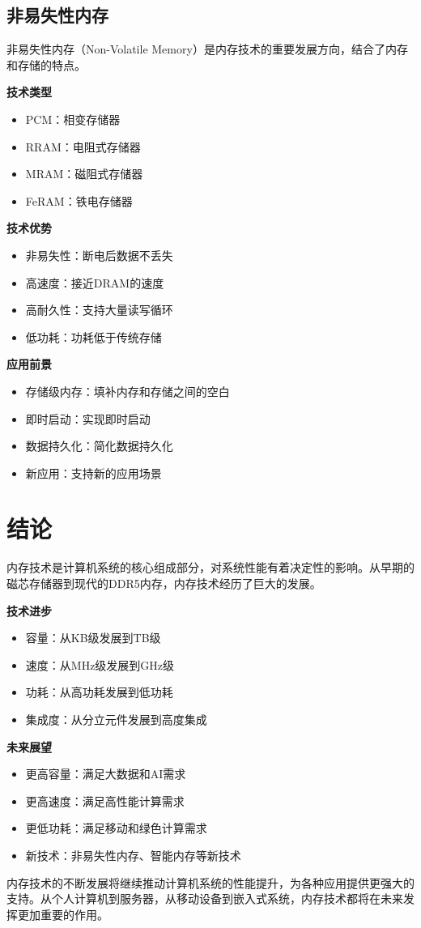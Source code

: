 \documentclass{article}
\begin{document}
\subsection{非易失性内存}

非易失性内存（Non-Volatile Memory）是内存技术的重要发展方向，结合了内存和存储的特点。

\textbf{技术类型}
\begin{itemize}
    \item PCM：相变存储器
    \item RRAM：电阻式存储器
    \item MRAM：磁阻式存储器
    \item FeRAM：铁电存储器
\end{itemize}

\textbf{技术优势}
\begin{itemize}
    \item 非易失性：断电后数据不丢失
    \item 高速度：接近DRAM的速度
    \item 高耐久性：支持大量读写循环
    \item 低功耗：功耗低于传统存储
\end{itemize}

\textbf{应用前景}
\begin{itemize}
    \item 存储级内存：填补内存和存储之间的空白
    \item 即时启动：实现即时启动
    \item 数据持久化：简化数据持久化
    \item 新应用：支持新的应用场景
\end{itemize}

\section{结论}

内存技术是计算机系统的核心组成部分，对系统性能有着决定性的影响。从早期的磁芯存储器到现代的DDR5内存，内存技术经历了巨大的发展。

\textbf{技术进步}
\begin{itemize}
    \item 容量：从KB级发展到TB级
    \item 速度：从MHz级发展到GHz级
    \item 功耗：从高功耗发展到低功耗
    \item 集成度：从分立元件发展到高度集成
\end{itemize}

\textbf{未来展望}
\begin{itemize}
    \item 更高容量：满足大数据和AI需求
    \item 更高速度：满足高性能计算需求
    \item 更低功耗：满足移动和绿色计算需求
    \item 新技术：非易失性内存、智能内存等新技术
\end{itemize}

内存技术的不断发展将继续推动计算机系统的性能提升，为各种应用提供更强大的支持。从个人计算机到服务器，从移动设备到嵌入式系统，内存技术都将在未来发挥更加重要的作用。
\end{document}
